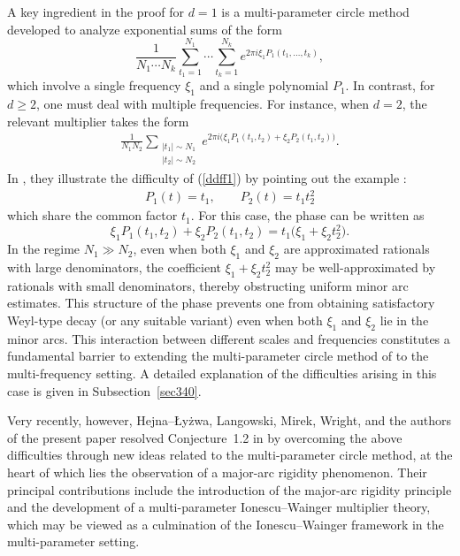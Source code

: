 \documentclass[10pt,a4paper]{amsart}
\numberwithin{equation}{section}
\begin{document}
A key ingredient in the proof for $d=1$ is a multi-parameter circle method developed to analyze exponential sums of the form
\[
	\frac{1}{N_1\cdots N_k}
\sum_{t_1=1}^{N_1}\cdots\sum_{t_k=1}^{N_k}
e^{2\pi i \xi_1 P_1(t_1,\dots,t_k)},
\]
which involve a single frequency $\xi_1$ and a single polynomial $P_1$.
In contrast, for $d\ge 2$, one must deal with multiple frequencies. For instance, when $d=2$, the relevant multiplier takes the form
\begin{align}\label{ddff1}
	\frac{1}{N_1 N_2}
	\sum_{\substack{|t_1|\sim N_1\\ |t_2|\sim N_2}}
	e^{2\pi i\bigl(\xi_1 P_1(t_1,t_2)+\xi_2 P_2(t_1,t_2)\bigr)}.
\end{align}
In \cite{B4},  they  illustrate the difficulty of (\ref{ddff1}) by  pointing out the example :
\begin{align}\label{tt}
P_1(t)=t_1,\qquad P_2(t)=t_1 t_2^2	
\end{align}
which share the common factor $t_1$.
For this case, the phase can be written as
\[
\xi_1 P_1(t_1,t_2)+\xi_2 P_2(t_1,t_2)
= t_1\bigl(\xi_1 + \xi_2 t_2^2\bigr).
\]
In the regime $N_1\gg N_2$, even when  both $\xi_1$ and $\xi_2$ are approximated rationals with large denominators, the coefficient $\xi_1+\xi_2 t_2^2$ may be well-approximated by rationals with small denominators, thereby obstructing uniform minor arc estimates. This structure of the phase prevents one from obtaining satisfactory Weyl-type decay (or any suitable variant) even when both $\xi_1$ and $\xi_2$ lie in the minor arcs.  This interaction between different scales and frequencies constitutes a fundamental barrier to extending the multi-parameter circle method of  \cite{B4} to the multi-frequency setting. A detailed explanation of the difficulties arising in this case is given in Subsection~\ref{sec340}.



Very recently, however, Hejna--Łyżwa, Langowski, Mirek, Wright, and the authors of the present paper resolved Conjecture~1.2 in \cite{HKLMSW} by overcoming the above difficulties through new ideas related to the multi-parameter circle method, at the heart of which lies the observation of a major-arc rigidity phenomenon. Their principal contributions include the introduction of the
major-arc rigidity principle and the development of a multi-parameter
Ionescu--Wainger multiplier theory, which may be viewed as a culmination of
the Ionescu--Wainger framework in the multi-parameter setting.
\end{document}
